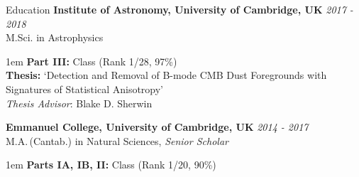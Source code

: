 \documentclass{resume} %
\begin{document}
\begin{rSection}{Education}
{\bf Institute of Astronomy, University of Cambridge, UK} \hfill {\em 2017 - 2018} \\ 
M.Sci. in Astrophysics
\begin{addmargin}[1em]{1em}
\textbf{Part III:}   Class (Rank 1/28, 97\%)\smallskip\\
\textbf{Thesis:} `Detection and Removal of B-mode CMB Dust Foregrounds with Signatures of Statistical Anisotropy'\smallskip\\
\textit{Thesis Advisor}: Blake D. Sherwin%
\end{addmargin}

{\bf Emmanuel College, University of Cambridge, UK}
\hfill {\em 2014 - 2017} \\
M.A.\,(Cantab.) in Natural Sciences, \textit{Senior Scholar}
\begin{addmargin}[1em]{1em}
\textbf{Parts IA, IB, II:}  Class (Rank 1/20, 90\%)
\end{addmargin}


\end{rSection}
\end{document}
